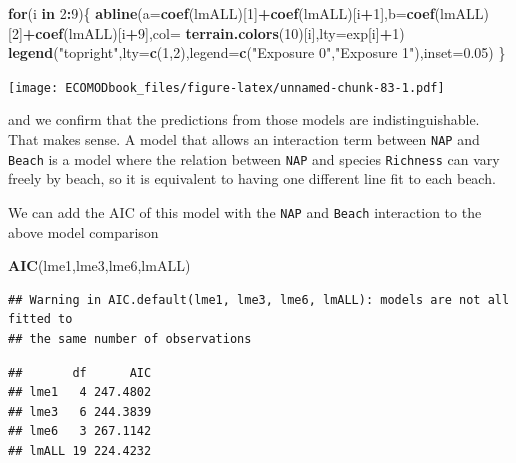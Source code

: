 \documentclass[
]{book}
\newenvironment{Shaded}{\begin{snugshade}}{\end{snugshade}}
\newcommand{\AttributeTok}[1]{\textcolor[rgb]{0.13,0.29,0.53}{#1}}
\newcommand{\ControlFlowTok}[1]{\textcolor[rgb]{0.13,0.29,0.53}{\textbf{#1}}}
\newcommand{\DecValTok}[1]{\textcolor[rgb]{0.00,0.00,0.81}{#1}}
\newcommand{\FloatTok}[1]{\textcolor[rgb]{0.00,0.00,0.81}{#1}}
\newcommand{\FunctionTok}[1]{\textcolor[rgb]{0.13,0.29,0.53}{\textbf{#1}}}
\newcommand{\NormalTok}[1]{#1}
\newcommand{\SpecialCharTok}[1]{\textcolor[rgb]{0.81,0.36,0.00}{\textbf{#1}}}
\newcommand{\StringTok}[1]{\textcolor[rgb]{0.31,0.60,0.02}{#1}}
\begin{document}
\begin{Shaded}
\begin{Highlighting}[]
\ControlFlowTok{for}\NormalTok{(i }\ControlFlowTok{in} \DecValTok{2}\SpecialCharTok{:}\DecValTok{9}\NormalTok{)\{}
  \FunctionTok{abline}\NormalTok{(}\AttributeTok{a=}\FunctionTok{coef}\NormalTok{(lmALL)[}\DecValTok{1}\NormalTok{]}\SpecialCharTok{+}\FunctionTok{coef}\NormalTok{(lmALL)[i}\SpecialCharTok{+}\DecValTok{1}\NormalTok{],}\AttributeTok{b=}\FunctionTok{coef}\NormalTok{(lmALL)[}\DecValTok{2}\NormalTok{]}\SpecialCharTok{+}\FunctionTok{coef}\NormalTok{(lmALL)[i}\SpecialCharTok{+}\DecValTok{9}\NormalTok{],}\AttributeTok{col=} \FunctionTok{terrain.colors}\NormalTok{(}\DecValTok{10}\NormalTok{)[i],}\AttributeTok{lty=}\NormalTok{exp[i]}\SpecialCharTok{+}\DecValTok{1}\NormalTok{)}
  \FunctionTok{legend}\NormalTok{(}\StringTok{"topright"}\NormalTok{,}\AttributeTok{lty=}\FunctionTok{c}\NormalTok{(}\DecValTok{1}\NormalTok{,}\DecValTok{2}\NormalTok{),}\AttributeTok{legend=}\FunctionTok{c}\NormalTok{(}\StringTok{"Exposure 0"}\NormalTok{,}\StringTok{"Exposure 1"}\NormalTok{),}\AttributeTok{inset=}\FloatTok{0.05}\NormalTok{)}
\NormalTok{\}}
\end{Highlighting}
\end{Shaded}

\texttt{[image: ECOMODbook\_files/figure-latex/unnamed-chunk-83-1.pdf]}

and we confirm that the predictions from those models are indistinguishable. That makes sense. A model that allows an interaction term between \texttt{NAP} and \texttt{Beach} is a model where the relation between \texttt{NAP} and species \texttt{Richness} can vary freely by beach, so it is equivalent to having one different line fit to each beach.

We can add the AIC of this model with the \texttt{NAP} and \texttt{Beach} interaction to the above model comparison

\begin{Shaded}
\begin{Highlighting}[]
\FunctionTok{AIC}\NormalTok{(lme1,lme3,lme6,lmALL)}
\end{Highlighting}
\end{Shaded}

\begin{verbatim}
## Warning in AIC.default(lme1, lme3, lme6, lmALL): models are not all fitted to
## the same number of observations
\end{verbatim}

\begin{verbatim}
##       df      AIC
## lme1   4 247.4802
## lme3   6 244.3839
## lme6   3 267.1142
## lmALL 19 224.4232
\end{verbatim}
\end{document}
